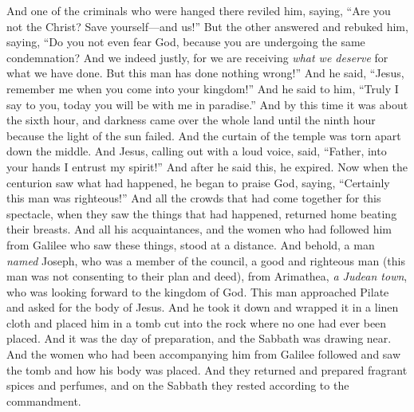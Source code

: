 \begin{biblechapter}
\verse And one of the criminals who were hanged there reviled him, saying, “Are you not the Christ? Save yourself—and us!”
\verse But the other answered and rebuked him, saying, “Do you not even fear God, because you are undergoing the same condemnation?
\verse And we indeed justly, for we are receiving \textit{what we deserve} for what we have done. But this man has done nothing wrong!”
\verse And he said, “Jesus, remember me when you come into your kingdom!”
\verse And he said to him, “Truly I say to you, today you will be with me in paradise.”
 And by this time it was about the sixth hour, and darkness came over the whole land until the ninth hour
\verse because the light of the sun failed. And the curtain of the temple was torn apart down the middle.
\verse And Jesus, calling out with a loud voice, said, “Father, into your hands I entrust my spirit!” And after he said this, he expired.
\verse Now when the centurion saw what had happened, he began to praise God, saying, “Certainly this man was righteous!”
\verse And all the crowds that had come together for this spectacle, when they saw the things that had happened, returned home beating their breasts.
\verse And all his acquaintances, and the women who had followed him from Galilee who saw these things, stood at a distance.
 And behold, a man \textit{named} Joseph, who was a member of the council, a good and righteous man
\verse (this man was not consenting to their plan and deed), from Arimathea, \textit{a Judean town}, who was looking forward to the kingdom of God.
\verse This man approached Pilate and asked for the body of Jesus.
\verse And he took it down and wrapped it in a linen cloth and placed him in a tomb cut into the rock where no one had ever been placed.
\verse And it was the day of preparation, and the Sabbath was drawing near.
\verse And the women who had been accompanying him from Galilee followed and saw the tomb and how his body was placed.
\verse And they returned and prepared fragrant spices and perfumes, and on the Sabbath they rested according to the commandment.
\end{biblechapter}

